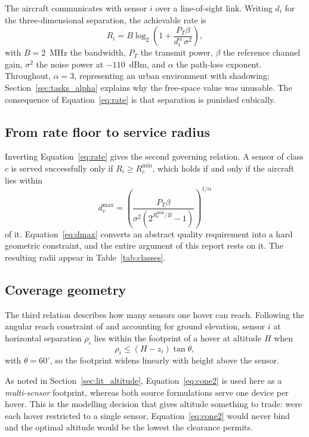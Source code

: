 The aircraft communicates with sensor $i$ over a line-of-sight link. Writing $d_i$ for the three-dimensional separation, the achievable rate is
\begin{equation}
R_i = B \log_2\!\left( 1 + \frac{P_T \beta}{d_i^{\alpha}\,\sigma^2} \right),
\label{eq:rate}
\end{equation}
with $B = 2$~MHz the bandwidth, $P_T$ the transmit power, $\beta$ the reference channel gain, $\sigma^2$ the noise power at $-110$~dBm, and $\alpha$ the path-loss exponent. Throughout, $\alpha = 3$, representing an urban environment with shadowing; Section~\ref{sec:tasks_alpha} explains why the free-space value was unusable. The consequence of Equation~\eqref{eq:rate} is that separation is punished cubically.

\subsection{From rate floor to service radius}

Inverting Equation~\eqref{eq:rate} gives the second governing relation. A sensor of class $c$ is served successfully only if $R_i \ge R^{\min}_c$, which holds if and only if the aircraft lies within
\begin{equation}
d^{\max}_c = \left( \frac{P_T \beta}{\sigma^2 \left( 2^{R^{\min}_c / B} - 1 \right)} \right)^{1/\alpha}
\label{eq:dmax}
\end{equation}
of it. Equation~\eqref{eq:dmax} converts an abstract quality requirement into a hard geometric constraint, and the entire argument of this report rests on it. The resulting radii appear in Table~\ref{tab:classes}.

\subsection{Coverage geometry}

The third relation describes how many sensors one hover can reach. Following the angular reach constraint of \cite{paperB} and accounting for ground elevation, sensor $i$ at horizontal separation $\rho_i$ lies within the footprint of a hover at altitude $H$ when
\begin{equation}
\rho_i \le (H - z_i)\tan\theta ,
\label{eq:cone2}
\end{equation}
with $\theta = 60^{\circ}$, so the footprint widens linearly with height above the sensor.

As noted in Section~\ref{sec:lit_altitude}, Equation~\eqref{eq:cone2} is used here as a \emph{multi-sensor} footprint, whereas both source formulations serve one device per hover. This is the modelling decision that gives altitude something to trade: were each hover restricted to a single sensor, Equation~\eqref{eq:cone2} would never bind and the optimal altitude would be the lowest the clearance permits.

